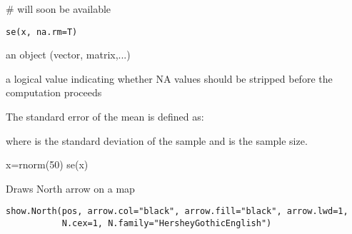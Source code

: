 \documentclass[a4paper]{book}
\begin{document}
%
\begin{Arguments}
\begin{ldescription}
\item[\code{x}] 


\item[\code{window}] 


\end{ldescription}
\end{Arguments}
%
\begin{Examples}
\begin{ExampleCode}
# will soon be available
\end{ExampleCode}
\end{Examples}
\newpage
{}
%
\begin{Usage}
\begin{verbatim}
se(x, na.rm=T)
\end{verbatim}
\end{Usage}
%
\begin{Arguments}
\begin{ldescription}
\item[\code{x}] an \R{} object (vector, matrix,...)

\item[\code{na.rm}] a logical value indicating whether NA values should be stripped before the computation proceeds

\end{ldescription}
\end{Arguments}
%
\begin{Details}\relax
The standard error of the mean is defined as:


where  is the standard deviation of the sample and  is the sample size.

\end{Details}
%
\begin{Examples}
\begin{ExampleCode}
x=rnorm(50)
se(x)
\end{ExampleCode}
\end{Examples}
\newpage
{}
%
\begin{Description}\relax
Draws North arrow on a map
\end{Description}
%
\begin{Usage}
\begin{verbatim}
show.North(pos, arrow.col="black", arrow.fill="black", arrow.lwd=1,
           N.cex=1, N.family="HersheyGothicEnglish")
\end{verbatim}
\end{Usage}
\end{document}
